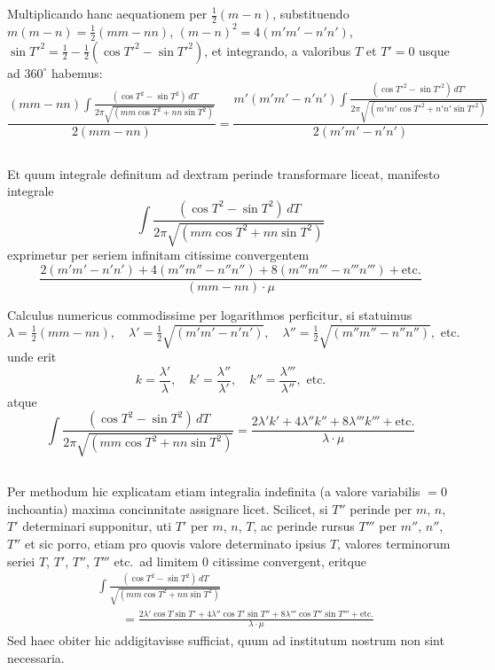\documentclass[12pt,a4paper]{article}
\begin{document}
Multiplicando hanc aequationem per $\frac{1}{2}(m-n)$, substituendo $m(m-n) = \frac{1}{2}(mm-nn)$, $(m-n)^2 = 4(m'm'-n'n')$, $\sin T'^2 = \frac{1}{2} - \frac{1}{2}(\cos T'^2 - \sin T'^2)$, et integrando, a valoribus $T$ et $T'=0$ usque ad $360^{\circ}$ habemus:
\[
\frac{(mm-nn)\int\frac{(\cos T^2 - \sin T^2)\,dT}{2\pi\sqrt{(mm\cos T^2 + nn\sin T^2)}}}{2(mm-nn)} =
\frac{m'(m'm'-n'n')\int\frac{(\cos T'^2 - \sin T'^2)\,dT'}{2\pi\sqrt{(m'm'\cos T'^2 + n'n'\sin T'^2)}}}{2(m'm'-n'n')}
\]

\setcounter{subsection}{17}
\subsection{}

Et quum integrale definitum ad dextram perinde transformare liceat, manifesto integrale
\[
\int\frac{(\cos T^2 - \sin T^2)\,dT}{2\pi\sqrt{(mm\cos T^2 + nn\sin T^2)}}
\]
exprimetur per seriem infinitam citissime convergentem
\[
\frac{2(m'm'-n'n') + 4(m''m''-n''n'') + 8(m'''m'''-n'''n''') + \text{etc.}}{(mm-nn)\cdot\mu}
\]

Calculus numericus commodissime per logarithmos perficitur, si statuimus
\[
\lambda = \tfrac{1}{2}(mm-nn), \quad \lambda' = \tfrac{1}{2}\sqrt{(m'm'-n'n')}, \quad \lambda'' = \tfrac{1}{2}\sqrt{(m''m''-n''n'')}, \text{ etc.}
\]
unde erit
\[
k = \frac{\lambda'}{\lambda}, \quad k' = \frac{\lambda''}{\lambda'}, \quad k'' = \frac{\lambda'''}{\lambda''}, \text{ etc.}
\]
atque
\[
\int\frac{(\cos T^2 - \sin T^2)\,dT}{2\pi\sqrt{(mm\cos T^2 + nn\sin T^2)}} =
\frac{2\lambda'k' + 4\lambda''k'' + 8\lambda'''k''' + \text{etc.}}{\lambda\cdot\mu}
\]

\setcounter{subsection}{18}
\subsection{}

Per methodum hic explicatam etiam integralia indefinita (a valore variabilis $=0$ inchoantia) maxima concinnitate assignare licet. Scilicet, si $T''$ perinde per $m$, $n$, $T'$ determinari supponitur, uti $T'$ per $m$, $n$, $T$, ac perinde rursus $T'''$ per $m''$, $n''$, $T''$ et sic porro, etiam pro quovis valore determinato ipsius $T$, valores terminorum seriei $T$, $T'$, $T''$, $T'''$ etc.\ ad limitem $0$ citissime convergent, eritque
\[
\begin{aligned}
&\int\frac{(\cos T^2 - \sin T^2)\,dT}{\sqrt{(mm\cos T^2 + nn\sin T^2)}} \\
&\qquad = \frac{2\lambda'\cos T\sin T' + 4\lambda''\cos T'\sin T'' + 8\lambda'''\cos T''\sin T''' + \text{etc.}}{\lambda\cdot\mu}
\end{aligned}
\]
Sed haec obiter hic addigitavisse sufficiat, quum ad institutum nostrum non sint necessaria.
\end{document}
